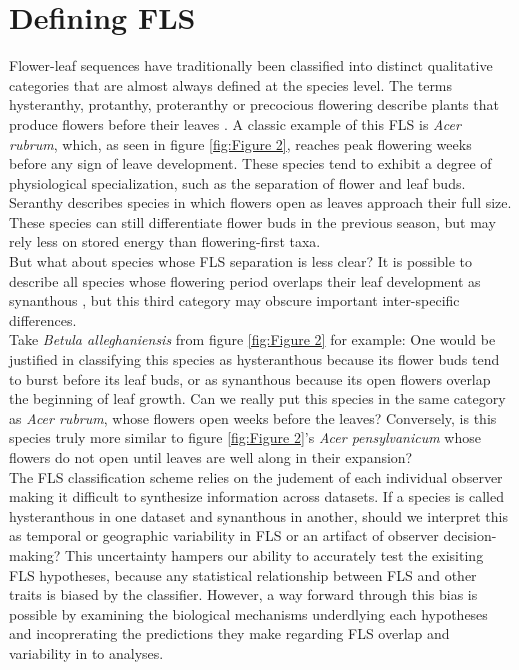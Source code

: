 \documentclass[12pt]{article}\usepackage[]{graphicx}\usepackage[]{color}
\begin{document}
\section*{Defining FLS}
\indent\indent Flower-leaf sequences have traditionally been classified into distinct qualitative categories that are almost always defined at the species level. The terms hysteranthy, protanthy, proteranthy or precocious flowering describe plants that produce flowers before their leaves \citep{Lamont2011, Heinig1899}. A classic example of this FLS is \textit{Acer rubrum}, which, as seen in figure \ref{fig:Figure 2}, reaches peak flowering weeks before any sign of leave development. These species tend to exhibit a degree of physiological specialization, such as the separation of flower and leaf buds. \\
\indent Seranthy %
describes species in which flowers open as leaves approach their full size. These species can still differentiate flower buds in the previous season, but may rely less on stored energy than flowering-first taxa.\\
\indent But what about species whose FLS separation is less clear? It is possible to describe all species whose flowering period overlaps their leaf development as synanthous \citep{Lamont2011}, but this third category may obscure important inter-specific differences.\\ %
 \indent Take \textit{Betula alleghaniensis} from figure \ref{fig:Figure 2} for example: One would be justified in classifying this species as hysteranthous because its flower buds tend to burst before its leaf buds, or as synanthous because its open flowers overlap the beginning of leaf growth. Can we really put this species in the same category as \textit{Acer rubrum}, whose flowers open weeks before the leaves? Conversely, is this species truly more similar to figure \ref{fig:Figure 2}'s \textit{Acer pensylvanicum} whose flowers do not open until leaves are well along in their expansion? \\
\indent  The FLS classification scheme relies on the judement of each individual observer making it difficult to synthesize information across datasets. If a species is called hysteranthous in one dataset and synanthous in another, should we interpret this as temporal or geographic variability in FLS or an artifact of observer decision-making? This uncertainty hampers our ability to accurately test the exisiting FLS hypotheses, because any statistical relationship between FLS and other traits is biased by the classifier. However, a way forward through this bias is possible by examining the biological mechanisms underdlying each hypotheses and incoprerating the predictions they make regarding FLS overlap and variability in to analyses.
 
\end{document}
